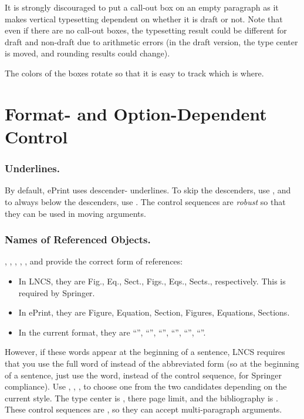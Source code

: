 
It is strongly discouraged to put a call-out box on an empty paragraph
as it makes vertical typesetting dependent on whether it is draft or not.
Note that even if there are no call-out boxes,
the typesetting result could be different for draft and non-draft
due to arithmetic errors
(in the draft version,
the type center is moved, and
rounding results could change).

The colors of the boxes rotate so that it is easy to track which is where.

\section{Format- and Option-Dependent Control }

\subsubsection{Underlines.}
By default, ePrint uses descender- underlines.
To  skip the descenders,
use \texttt{\string\smartunderline}, and
to always  below the descenders,
use \texttt{\string\dumbunderline}.
The control sequences are \emph{robust} so that
they can be used in moving arguments.

\subsubsection{Names of Referenced Objects.}
\texttt{\string\Figure},
\texttt{\string\Equation},
\texttt{\string\Section},
\texttt{\string\Figures},
\texttt{\string\Equations}, and
\texttt{\string\Sections}
provide the correct form of references:
\begin{itemize}
\item
In LNCS, they are Fig., Eq., Sect., Figs., Eqs., Sects., respectively.
This is required by Springer.
\item
In ePrint, they are Figure, Equation, Section, Figures, Equations, Sections.
\item
In the current format, they are
``\Figure'', ``\Equation'', ``\Section'',
``\Figures'', ``\Equations'', ``\Sections''.
\end{itemize}
However, if these words appear at the beginning of a sentence,
LNCS requires that you use the full word of instead of the abbreviated form
(so at the beginning of a sentence,
just use the word, instead of the control sequence,
for Springer compliance).
Use
\texttt{\string\WideNarrow},
\texttt{\string\PageLimitsNoLimits},
\texttt{\string\BibAlphaNumeric},
to choose one from the two candidates depending on the current style.
The type center is ,
there  page limit,
and the bibliography is .
These control sequences are \texttt{\string\long},
so they can accept multi-paragraph arguments.

